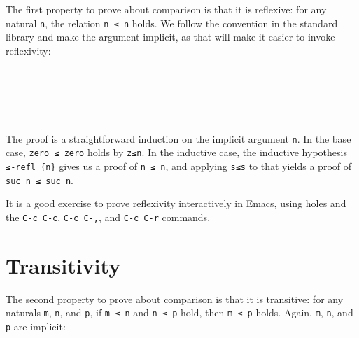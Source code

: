 The first property to prove about comparison is that it is reflexive:
for any natural \texttt{n}, the relation \texttt{n\ ≤\ n} holds. We
follow the convention in the standard library and make the argument
implicit, as that will make it easier to invoke reflexivity:

\begin{fence}
\begin{code}%
\>[0]\AgdaSpace{}%
\AgdaSymbol{:}\AgdaSpace{}%
\AgdaSpace{}%
\AgdaSymbol{\{}\AgdaSpace{}%
\AgdaSymbol{:}\AgdaSpace{}%
\AgdaSymbol{\}}\<%
\\
\>[0][@{}l@{\AgdaIndent{0}}]%
\>[4]\AgdaComment{-----}\<%
\\
\>[0][@{}l@{\AgdaIndent{0}}]%
\>[2]\AgdaSpace{}%
\AgdaSpace{}%
\AgdaSpace{}%
\<%
\\
\>[0]\AgdaSpace{}%
\AgdaSymbol{\{}\AgdaSymbol{\}}\AgdaSpace{}%
\AgdaSymbol{=}\AgdaSpace{}%
\<%
\\
\>[0]\AgdaSpace{}%
\AgdaSymbol{\{}\AgdaSpace{}%
\AgdaSymbol{\}}\AgdaSpace{}%
\AgdaSymbol{=}\AgdaSpace{}%
\AgdaSpace{}%
\<%
\end{code}
\end{fence}

The proof is a straightforward induction on the implicit argument
\texttt{n}. In the base case, \texttt{zero\ ≤\ zero} holds by
\texttt{z≤n}. In the inductive case, the inductive hypothesis
\texttt{≤-refl\ \{n\}} gives us a proof of \texttt{n\ ≤\ n}, and
applying \texttt{s≤s} to that yields a proof of
\texttt{suc\ n\ ≤\ suc\ n}.

It is a good exercise to prove reflexivity interactively in Emacs, using
holes and the \texttt{C-c\ C-c}, \texttt{C-c\ C-,}, and
\texttt{C-c\ C-r} commands.

\hypertarget{transitivity}{%
\section{Transitivity}\label{transitivity}}

The second property to prove about comparison is that it is transitive:
for any naturals \texttt{m}, \texttt{n}, and \texttt{p}, if
\texttt{m\ ≤\ n} and \texttt{n\ ≤\ p} hold, then \texttt{m\ ≤\ p} holds.
Again, \texttt{m}, \texttt{n}, and \texttt{p} are implicit:

